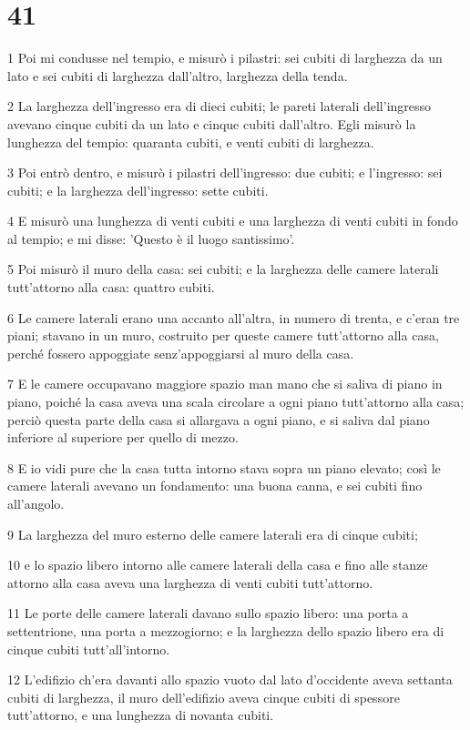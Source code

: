 \chapter{41}

\par 1 Poi mi condusse nel tempio, e misurò i pilastri: sei cubiti di larghezza da un lato e sei cubiti di larghezza dall'altro, larghezza della tenda.
\par 2 La larghezza dell'ingresso era di dieci cubiti; le pareti laterali dell'ingresso avevano cinque cubiti da un lato e cinque cubiti dall'altro. Egli misurò la lunghezza del tempio: quaranta cubiti, e venti cubiti di larghezza.
\par 3 Poi entrò dentro, e misurò i pilastri dell'ingresso: due cubiti; e l'ingresso: sei cubiti; e la larghezza dell'ingresso: sette cubiti.
\par 4 E misurò una lunghezza di venti cubiti e una larghezza di venti cubiti in fondo al tempio; e mi disse: 'Questo è il luogo santissimo'.
\par 5 Poi misurò il muro della casa: sei cubiti; e la larghezza delle camere laterali tutt'attorno alla casa: quattro cubiti.
\par 6 Le camere laterali erano una accanto all'altra, in numero di trenta, e c'eran tre piani; stavano in un muro, costruito per queste camere tutt'attorno alla casa, perché fossero appoggiate senz'appoggiarsi al muro della casa.
\par 7 E le camere occupavano maggiore spazio man mano che si saliva di piano in piano, poiché la casa aveva una scala circolare a ogni piano tutt'attorno alla casa; perciò questa parte della casa si allargava a ogni piano, e si saliva dal piano inferiore al superiore per quello di mezzo.
\par 8 E io vidi pure che la casa tutta intorno stava sopra un piano elevato; così le camere laterali avevano un fondamento: una buona canna, e sei cubiti fino all'angolo.
\par 9 La larghezza del muro esterno delle camere laterali era di cinque cubiti;
\par 10 e lo spazio libero intorno alle camere laterali della casa e fino alle stanze attorno alla casa aveva una larghezza di venti cubiti tutt'attorno.
\par 11 Le porte delle camere laterali davano sullo spazio libero: una porta a settentrione, una porta a mezzogiorno; e la larghezza dello spazio libero era di cinque cubiti tutt'all'intorno.
\par 12 L'edifizio ch'era davanti allo spazio vuoto dal lato d'occidente aveva settanta cubiti di larghezza, il muro dell'edifizio aveva cinque cubiti di spessore tutt'attorno, e una lunghezza di novanta cubiti.
